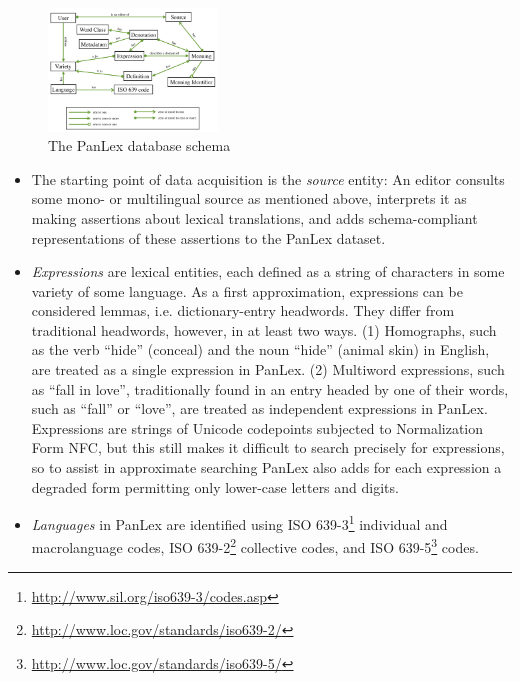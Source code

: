 \documentclass[sw]{iosart2c}
\begin{document}
\begin{figure}
  \centering
  \includegraphics[width=0.4\textwidth]{images/schema_new.png}
  \caption{The PanLex database schema}
  \label{fig:db-schema}
\end{figure}

\begin{itemize}
  \item The starting point of data acquisition is the \emph{source} entity: An editor consults some mono- or multilingual source as mentioned above, interprets it as making assertions about lexical translations, and adds schema-compliant representations of these assertions to the PanLex dataset.
  \item \emph{Expressions} are lexical entities, each defined as a string of characters in some variety of some language. As a first approximation, expressions can be considered lemmas, i.e. dictionary-entry headwords. They differ from traditional headwords, however, in at least two ways. (1) Homographs, such as the verb ``hide'' (conceal) and the noun ``hide'' (animal skin) in English, are treated as a single expression in PanLex. (2) Multiword expressions, such as ``fall in love'', traditionally found in an entry headed by one of their words, such as ``fall'' or ``love'', are treated as independent expressions in PanLex. Expressions are strings of Unicode codepoints subjected to Normalization Form NFC, but this still makes it difficult to search precisely for expressions, so to assist in approximate searching PanLex also adds for each expression a degraded form permitting only lower-case letters and digits.
    \item \emph{Languages} in PanLex are identified using ISO 639-3\footnote{\url{http://www.sil.org/iso639-3/codes.asp}} individual and macrolanguage codes, ISO 639-2\footnote{\url{http://www.loc.gov/standards/iso639-2/}} collective codes, and ISO 639-5\footnote{\url{http://www.loc.gov/standards/iso639-5/}} codes.

\end{itemize}
\end{document}
